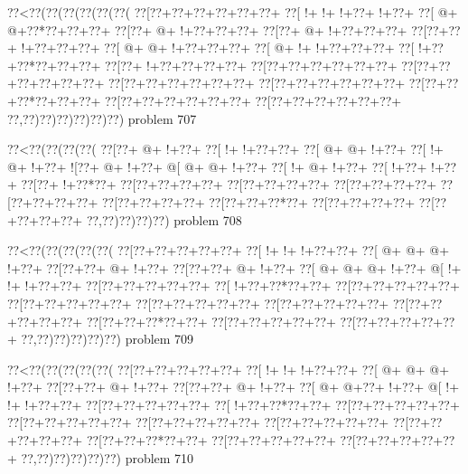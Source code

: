 \vbox{\vbox{\goo
\0??<\0??(\0??(\0??(\0??(\0??(\0??(
\0??[\0??+\0??+\0??+\0??+\0??+\0??+
\0??[\- !+\- !+\- !+\0??+\- !+\0??+
\0??[\- @+\- @+\0??*\0??+\0??+\0??+
\0??[\0??+\- @+\- !+\0??+\0??+\0??+
\0??[\0??+\- @+\- !+\0??+\0??+\0??+
\0??[\0??+\0??+\- !+\0??+\0??+\0??+
\0??[\- @+\- @+\- !+\0??+\0??+\0??+
\0??[\- @+\- !+\- !+\0??+\0??+\0??+
\0??[\- !+\0??+\0??*\0??+\0??+\0??+
\0??[\0??+\- !+\0??+\0??+\0??+\0??+
\0??[\0??+\0??+\0??+\0??+\0??+\0??+
\0??[\0??+\0??+\0??+\0??+\0??+\0??+
\0??[\0??+\0??+\0??+\0??+\0??+\0??+
\0??[\0??+\0??+\0??+\0??+\0??+\0??+
\0??[\0??+\0??+\0??*\0??+\0??+\0??+
\0??[\0??+\0??+\0??+\0??+\0??+\0??+
\0??[\0??+\0??+\0??+\0??+\0??+\0??+
\0??,\0??)\0??)\0??)\0??)\0??)\0??)
}
\hfil problem 707\hfil\break
}

\vbox{\vbox{\goo
\0??<\0??(\0??(\0??(\0??(
\0??[\0??+\- @+\- !+\0??+
\0??[\- !+\- !+\0??+\0??+
\0??[\- @+\- @+\- !+\0??+
\0??[\- !+\- @+\- !+\0??+
\- ![\0??+\- @+\- !+\0??+
\- @[\- @+\- @+\- !+\0??+
\0??[\- !+\- @+\- !+\0??+
\0??[\- !+\0??+\- !+\0??+
\0??[\0??+\- !+\0??*\0??+
\0??[\0??+\0??+\0??+\0??+
\0??[\0??+\0??+\0??+\0??+
\0??[\0??+\0??+\0??+\0??+
\0??[\0??+\0??+\0??+\0??+
\0??[\0??+\0??+\0??+\0??+
\0??[\0??+\0??+\0??*\0??+
\0??[\0??+\0??+\0??+\0??+
\0??[\0??+\0??+\0??+\0??+
\0??,\0??)\0??)\0??)\0??)
}
\hfil problem 708\hfil\break
}

\vbox{\vbox{\goo
\0??<\0??(\0??(\0??(\0??(\0??(
\0??[\0??+\0??+\0??+\0??+\0??+
\0??[\- !+\- !+\- !+\0??+\0??+
\0??[\- @+\- @+\- @+\- !+\0??+
\0??[\0??+\0??+\- @+\- !+\0??+
\0??[\0??+\0??+\- @+\- !+\0??+
\0??[\- @+\- @+\- @+\- !+\0??+
\- @[\- !+\- !+\- !+\0??+\0??+
\0??[\0??+\0??+\0??+\0??+\0??+
\0??[\- !+\0??+\0??*\0??+\0??+
\0??[\0??+\0??+\0??+\0??+\0??+
\0??[\0??+\0??+\0??+\0??+\0??+
\0??[\0??+\0??+\0??+\0??+\0??+
\0??[\0??+\0??+\0??+\0??+\0??+
\0??[\0??+\0??+\0??+\0??+\0??+
\0??[\0??+\0??+\0??*\0??+\0??+
\0??[\0??+\0??+\0??+\0??+\0??+
\0??[\0??+\0??+\0??+\0??+\0??+
\0??,\0??)\0??)\0??)\0??)\0??)
}
\hfil problem 709\hfil\break
}

\vbox{\vbox{\goo
\0??<\0??(\0??(\0??(\0??(\0??(
\0??[\0??+\0??+\0??+\0??+\0??+
\0??[\- !+\- !+\- !+\0??+\0??+
\0??[\- @+\- @+\- @+\- !+\0??+
\0??[\0??+\0??+\- @+\- !+\0??+
\0??[\0??+\0??+\- @+\- !+\0??+
\0??[\- @+\- @+\0??+\- !+\0??+
\- @[\- !+\- !+\- !+\0??+\0??+
\0??[\0??+\0??+\0??+\0??+\0??+
\0??[\- !+\0??+\0??*\0??+\0??+
\0??[\0??+\0??+\0??+\0??+\0??+
\0??[\0??+\0??+\0??+\0??+\0??+
\0??[\0??+\0??+\0??+\0??+\0??+
\0??[\0??+\0??+\0??+\0??+\0??+
\0??[\0??+\0??+\0??+\0??+\0??+
\0??[\0??+\0??+\0??*\0??+\0??+
\0??[\0??+\0??+\0??+\0??+\0??+
\0??[\0??+\0??+\0??+\0??+\0??+
\0??,\0??)\0??)\0??)\0??)\0??)
}
\hfil problem 710\hfil\break
}

